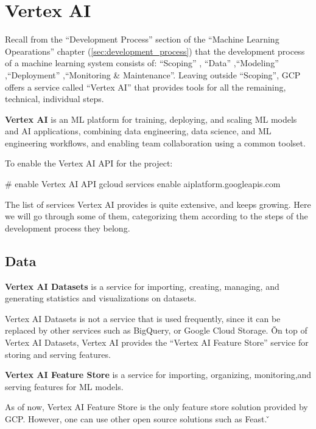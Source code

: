 \section{Vertex AI}

Recall from the ``Development Process'' section of the ``Machine Learning Opearations'' chapter
(\ref{sec:development_process}) that the development process of a machine learning system consists of: ``Scoping'' ,
``Data'' ,``Modeling'' ,``Deployment'' ,``Monitoring \& Maintenance''. Leaving outside ``Scoping'', GCP offers a
service called ``Vertex AI'' that provides tools for all the remaining, technical, individual steps.

\bd[Vertex AI]
\textbf{Vertex AI} is an ML platform for training, deploying, and scaling ML models and AI applications, combining data
engineering, data science, and ML engineering workflows, and enabling team collaboration using a common toolset.
\ed

To enable the Vertex AI API for the project:
\begin{bash}
# enable Vertex AI API
gcloud services enable aiplatform.googleapis.com
\end{bash}

The list of services Vertex AI provides is quite extensive, and keeps growing. Here we will go through some of them,
categorizing them according to the steps of the development process they belong.

\subsection{Data}

\textbf{Vertex AI Datasets} is a service for importing, creating, managing, and generating statistics and visualizations
on datasets.
\ed

Vertex AI Datasets is not a service that is used frequently, since it can be replaced by other services such as
BigQuery, or Google Cloud Storage. \v

On top of Vertex AI Datasets, Vertex AI provides the ``Vertex AI Feature Store'' service for storing and serving
features.

\textbf{Vertex AI Feature Store} is a service for importing, organizing, monitoring,and serving features for ML models.
\ed

As of now, Vertex AI Feature Store is the only feature store solution provided by GCP\@. However, one can use other
open source solutions such as Feast. \v

